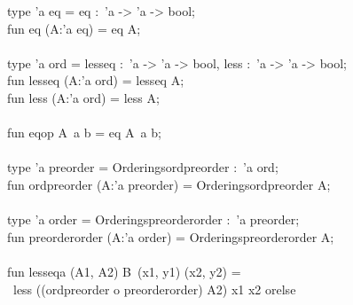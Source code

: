 \begin{isabellebody}
\begin{isamarkuptext}
\hspace*{0pt}type 'a eq = {}eq :~'a -> 'a -> bool{};\\
\hspace*{0pt}fun eq (A{}:'a eq) = {}eq A{};\\
\hspace*{0pt}\\
\hspace*{0pt}type 'a ord = {}less{}eq :~'a -> 'a -> bool, less :~'a -> 'a -> bool{};\\
\hspace*{0pt}fun less{}eq (A{}:'a ord) = {}less{}eq A{};\\
\hspace*{0pt}fun less (A{}:'a ord) = {}less A{};\\
\hspace*{0pt}\\
\hspace*{0pt}fun eqop A{}~a b = eq A{}~a b;\\
\hspace*{0pt}\\
\hspace*{0pt}type 'a preorder = {}Orderings{}{}ord{}preorder :~'a ord{};\\
\hspace*{0pt}fun ord{}preorder (A{}:'a preorder) = {}Orderings{}{}ord{}preorder A{};\\
\hspace*{0pt}\\
\hspace*{0pt}type 'a order = {}Orderings{}{}preorder{}order :~'a preorder{};\\
\hspace*{0pt}fun preorder{}order (A{}:'a order) = {}Orderings{}{}preorder{}order A{};\\
\hspace*{0pt}\\
\hspace*{0pt}fun less{}eqa (A1{}, A2{}) B{}~(x1, y1) (x2, y2) =\\
\hspace*{0pt} ~less ((ord{}preorder o preorder{}order) A2{}) x1 x2 orelse\\

\end{isamarkuptext}
\end{isabellebody}
